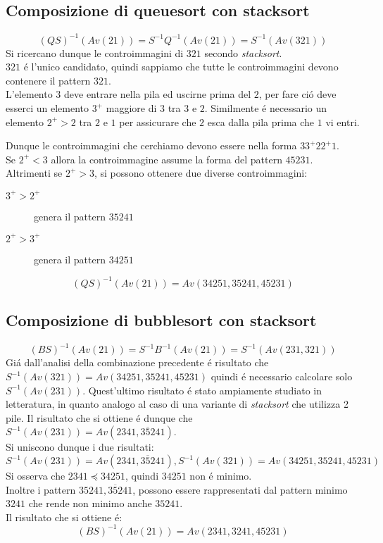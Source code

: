 \subsection*{Composizione  di {queuesort} con {stacksort}}
$$(QS)^{-1}(Av(21))=S^{-1}Q^{-1}(Av(21))=S^{-1}(Av(321))$$
Si ricercano dunque le controimmagini di $321$ secondo \textit{stacksort}.\\$321$ \'e l'unico candidato, quindi sappiamo che tutte le controimmagini devono contenere il pattern $321$.\\
L'elemento $3$ deve entrare nella pila ed uscirne prima del $2$, per fare ci\'o deve esserci un elemento $3^+$ maggiore di $3$ tra $3$ e $2$. Similmente \'e necessario un elemento $2^+>2$ tra $2$ e $1$ per assicurare che $2$ esca dalla pila prima che $1$ vi entri.\\
\begin{center}
\end{center}
Dunque le controimmagini che cerchiamo devono essere nella forma $33^+22^+1$.\\
Se $2^+<3$ allora la controimmagine assume la forma del pattern $45231$.\\
Altrimenti se $2^+>3$, si possono ottenere due diverse controimmagini:
\begin{description}
	\item[$3^+>2^+$] genera il pattern $35241$
	\item[$2^+>3^+$] genera il pattern $34251$
\end{description}
$$(QS)^{-1}(Av(21)) = Av(34251, 35241, 45231)$$
\subsection*{Composizione di {bubblesort} con {stacksort}}
$$(BS)^{-1}(Av(21))=S^{-1}B^{-1}(Av(21))=S^{-1}(Av(231,321))$$
Gi\'a dall'analisi della combinazione precedente \'e risultato che $S^{-1}(Av(321))=Av(34251, 35241, 45231)$ quindi \'e necessario calcolare solo $S^{-1}(Av(231))$. Quest'ultimo risultato \'e stato ampiamente studiato in letteratura, in quanto analogo al caso di una variante di \textit{stacksort} che utilizza 2 pile. Il risultato che si ottiene \'e dunque che $S^{-1}(Av(231))=Av(2341, 3\overline{5}241)$\cite{claesson2012sorting}.\\
Si uniscono dunque i due risultati:
$$S^{-1}(Av(231))=Av(2341,3\overline{5}241), S^{-1}(Av(321))=Av(34251, 35241, 45231)$$
Si osserva che $2341\preceq 34251$, quindi $34251$ non \'e minimo.\\
Inoltre i pattern $35241, 3\overline{5}241$, possono essere rappresentati dal pattern minimo $3241$ che rende non minimo anche $35241$.\\Il risultato che si ottiene \'e:$$(BS)^{-1}(Av(21))=Av(2341,3241,45231)$$
